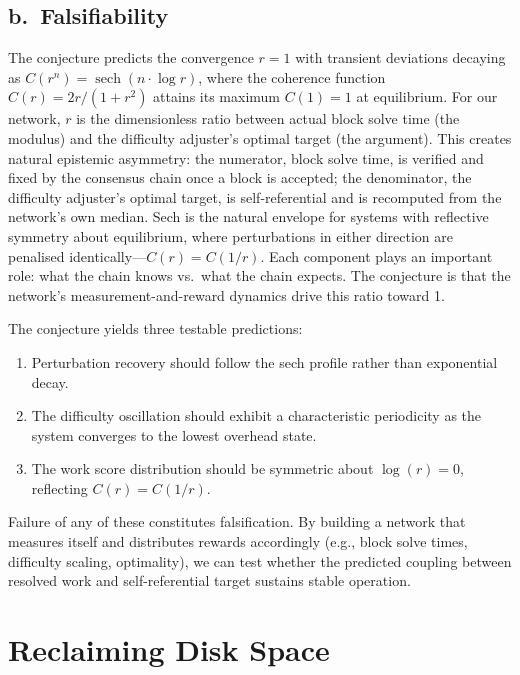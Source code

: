 \documentclass[12pt,letterpaper]{article}
\begin{document}
\subsection*{b.\ Falsifiability}

The conjecture predicts the convergence $r = 1$ with transient deviations decaying as
$C(r^n) = \operatorname{sech}(n \cdot \log r)$, where the coherence function
$C(r) = 2r / (1 + r^2)$ attains its maximum $C(1) = 1$ at equilibrium. For our network, $r$ is the
dimensionless ratio between actual block solve time (the modulus) and the difficulty adjuster's optimal
target (the argument). This creates natural epistemic asymmetry: the numerator, block solve time, is
verified and fixed by the consensus chain once a block is accepted; the denominator, the difficulty
adjuster's optimal target, is self-referential and is recomputed from the network's own median.
Sech is the natural envelope for systems with reflective symmetry about equilibrium, where perturbations
in either direction are penalised identically---$C(r) = C(1/r)$. Each component plays an important role:
what the chain knows vs.\ what the chain expects. The conjecture is that the network's
measurement-and-reward dynamics drive this ratio toward 1.

The conjecture yields three testable predictions:

\begin{enumerate}[leftmargin=2em,itemsep=2pt]
  \item Perturbation recovery should follow the sech profile rather than exponential decay.
  \item The difficulty oscillation should exhibit a characteristic periodicity as the system converges to
        the lowest overhead state.
  \item The work score distribution should be symmetric about $\log(r) = 0$, reflecting $C(r) = C(1/r)$.
\end{enumerate}

Failure of any of these constitutes falsification. By building a network that measures itself and
distributes rewards accordingly (e.g., block solve times, difficulty scaling, optimality), we can test
whether the predicted coupling between resolved work and self-referential target sustains stable
operation.

\section*{Reclaiming Disk Space}
\end{document}
